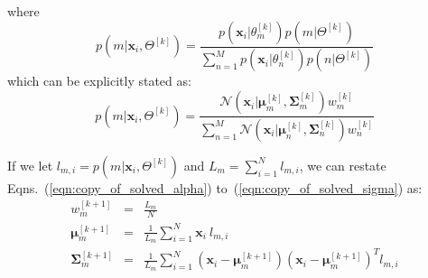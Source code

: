 \documentclass[10pt,a4paper]{article}
\def\Vec#1{{\boldsymbol{#1}}}
\def\Mat#1{{\boldsymbol{#1}}}
\renewcommand{\baselinestretch}{1.1}\small\normalsize
\begin{document}
\noindent
where
%
\begin{equation}
	p(m | \Vec{x}_i, \Theta^{[k]}) = \frac{ p(\Vec{x}_i | \theta_{m}^{[k]}) p(m | \Theta^{[k]}) }{ \sum\nolimits_{n=1}^{M} p(\Vec{x}_i | \theta_{n}^{[k]}) p(n | \Theta^{[k]})}
\end{equation}
%
which can be explicitly stated as:
%
\begin{equation}
	p(m | \Vec{x}_i, \Theta^{[k]}) = \frac{ {\mathcal{N}}( \Vec{x}_i | \Vec{\mu}_m^{[k]},  \Mat{\Sigma}_m^{[k]} )  w_m^{[k]} }
										{ \sum\nolimits_{n=1}^{M} {\mathcal{N}}( \Vec{x}_i | \Vec{\mu}_n^{[k]}, \Mat{\Sigma}_n^{[k]} ) w_n^{[k]} }
\end{equation}

\noindent
If we let $l_{m,i} = p(m | \Vec{x}_i, \Theta^{[k]})$ and $L_m = \sum\nolimits_{i=1}^{N} l_{m,i} $, we can restate Eqns.~(\ref{eqn:copy_of_solved_alpha})
to~(\ref{eqn:copy_of_solved_sigma}) as:
%
\begin{eqnarray}
	w_m^{[k+1]}	& = & \frac{L_m}{N} \\  
	\Vec{\mu}_m^{[k+1]} & = & \frac{1}{L_m} \sum\nolimits_{i=1}^{N} \Vec{x}_i ~ l_{m,i} \\
	\Mat{\Sigma}_m^{[k+1]}	& = & \frac{1}{L_m} \sum\nolimits_{i=1}^{N} (\Vec{x}_i - \Vec{\mu}_m^{[k+1]}) (\Vec{x}_i - \Vec{\mu}_m^{[k+1]})^T  l_{m,i}
\end{eqnarray}


\newpage
\renewcommand{\baselinestretch}{1.06}\small\normalsize
\small


\end{document}
